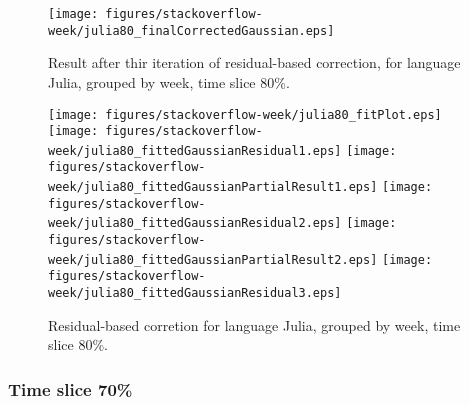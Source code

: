 \begin{figure}[]
\centering
{\texttt{[image: figures/stackoverflow-week/julia80\_finalCorrectedGaussian.eps]}}
\caption{Result after thir iteration of residual-based correction, for language Julia, grouped by week, time slice 80\%.}
\end{figure}


\begin{figure}[hb]
\centering
{}
{\texttt{[image: figures/stackoverflow-week/julia80\_fitPlot.eps]}}
{\texttt{[image: figures/stackoverflow-week/julia80\_fittedGaussianResidual1.eps]}}
{\texttt{[image: figures/stackoverflow-week/julia80\_fittedGaussianPartialResult1.eps]}}
{\texttt{[image: figures/stackoverflow-week/julia80\_fittedGaussianResidual2.eps]}}
{\texttt{[image: figures/stackoverflow-week/julia80\_fittedGaussianPartialResult2.eps]}}
{\texttt{[image: figures/stackoverflow-week/julia80\_fittedGaussianResidual3.eps]}}
\caption{Residual-based corretion for language Julia, grouped by week, time slice 80\%.}
\end{figure}


\clearpage 
\newpage 


\FloatBarrier

\subsubsection{Time slice 70\%}

